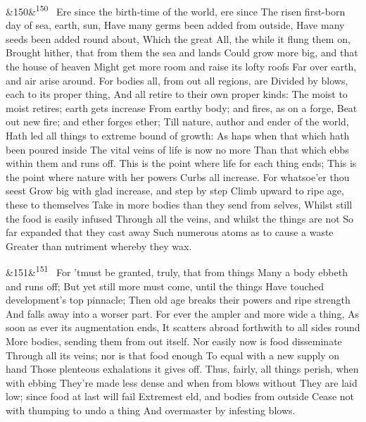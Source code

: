 \documentclass[12pt]{article}
\newcommand{\para}[1][]{\par\noindent\ifx&#1&\else\textsuperscript{\footnotesize #1}~\fi}
\begin{document}
\para[150] Ere since the birth-time of the world, ere since The risen first-born day of sea, earth, sun, Have many germs been added from outside, Have many seeds been added round about, Which the great All, the while it flung them on, Brought hither, that from them the sea and lands Could grow more big, and that the house of heaven Might get more room and raise its lofty roofs Far over earth, and air arise around. For bodies all, from out all regions, are Divided by blows, each to its proper thing, And all retire to their own proper kinds: The moist to moist retires; earth gets increase From earthy body; and fires, as on a forge, Beat out new fire; and ether forges ether; Till nature, author and ender of the world, Hath led all things to extreme bound of growth: As haps when that which hath been poured inside The vital veins of life is now no more Than that which ebbs within them and runs off. This is the point where life for each thing ends; This is the point where nature with her powers Curbs all increase. For whatsoe'er thou seest Grow big with glad increase, and step by step Climb upward to ripe age, these to themselves Take in more bodies than they send from selves, Whilst still the food is easily infused Through all the veins, and whilst the things are not So far expanded that they cast away Such numerous atoms as to cause a waste Greater than nutriment whereby they wax.

\para[151] For 'tmust be granted, truly, that from things Many a body ebbeth and runs off; But yet still more must come, until the things Have touched development's top pinnacle; Then old age breaks their powers and ripe strength And falls away into a worser part. For ever the ampler and more wide a thing, As soon as ever its augmentation ends, It scatters abroad forthwith to all sides round More bodies, sending them from out itself. Nor easily now is food disseminate Through all its veins; nor is that food enough To equal with a new supply on hand Those plenteous exhalations it gives off. Thus, fairly, all things perish, when with ebbing They're made less dense and when from blows without They are laid low; since food at last will fail Extremest eld, and bodies from outside Cease not with thumping to undo a thing And overmaster by infesting blows.
\end{document}
